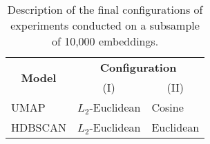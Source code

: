 \begin{longtable}[c]{|l|ll|}
    \caption{Description of the final configurations of experiments conducted on a subsample of 10,000 embeddings.}
    \label{tab:experiment_configs}\\
    \hline
    \multicolumn{1}{|c|}{\multirow{2}{*}{\textbf{Model}}} & \multicolumn{2}{c|}{\textbf{Configuration}}                         \\ \cline{2-3}
    \multicolumn{1}{|c|}{}                                 & \multicolumn{1}{c|}{(I)}               & \multicolumn{1}{c|}{(II)}  \\ \hline
    \endfirsthead

    \endhead

    UMAP    & \multicolumn{1}{l|}{$L_2$-Euclidean} & \multicolumn{1}{l|}{Cosine}    \\
    HDBSCAN & \multicolumn{1}{l|}{$L_2$-Euclidean} & \multicolumn{1}{l|}{Euclidean} \\ \hline
\end{longtable}